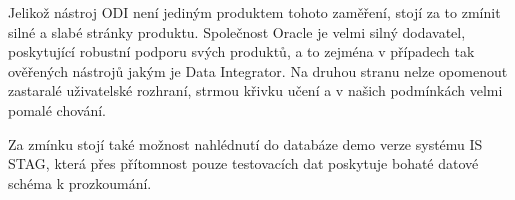 Jelikož nástroj ODI není jediným produktem tohoto zaměření, stojí za to zmínit silné a slabé stránky produktu.
Společnost Oracle je velmi silný dodavatel, poskytující robustní podporu svých produktů, a to zejména v případech tak ověřených nástrojů jakým je Data Integrator.
Na druhou stranu nelze opomenout zastaralé uživatelské rozhraní, strmou křivku učení a v našich podmínkách velmi pomalé chování.

Za zmínku stojí také možnost nahlédnutí do databáze demo verze systému IS STAG, která přes přítomnost pouze testovacích dat poskytuje bohaté datové schéma k prozkoumání.
